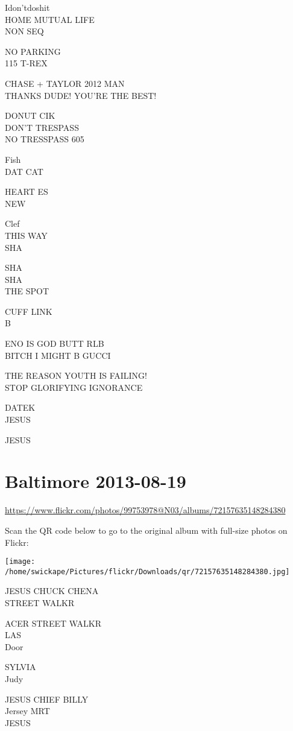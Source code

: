 \documentclass[10pt,letterpaper]{article}
\begin{document}
Idon'tdoshit\\
HOME MUTUAL LIFE\\
NON SEQ

NO PARKING\\
115 T{-}REX

CHASE + TAYLOR 2012 MAN\\
THANKS DUDE! YOU'RE THE BEST!

DONUT CIK\\
DON'T TRESPASS\\
NO TRESSPASS 605

Fish\\
DAT CAT

HEART ES\\
NEW

Clef\\
THIS WAY\\
SHA

SHA\\
SHA\\
THE SPOT

CUFF LINK\\
B

ENO IS GOD BUTT RLB\\
BITCH I MIGHT B GUCCI

THE REASON YOUTH IS FAILING!\\
STOP GLORIFYING IGNORANCE

DATEK\\
JESUS

JESUS
\pagebreak

\section*{Baltimore 2013-08-19}

\url{https://www.flickr.com/photos/99753978@N03/albums/72157635148284380}

Scan the QR code below to go to the original album with full-size photos on Flickr:

\texttt{[image: /home/swickape/Pictures/flickr/Downloads/qr/72157635148284380.jpg]}
\pagebreak

JESUS CHUCK CHENA\\
STREET WALKR

ACER STREET WALKR\\
LAS\\
Door

SYLVIA\\
Judy

JESUS CHIEF BILLY\\
Jersey MRT\\
JESUS
\end{document}
